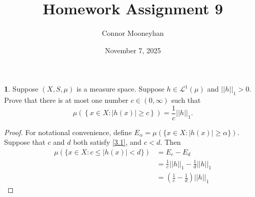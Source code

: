 \documentclass[12pt]{article}
\title{Homework Assignment 9}
\author{Connor Mooneyhan}
\date{November 7, 2025}
\theoremstyle{definition}
\newtheorem{ex}{}
\newenvironment{exercise}[1]{
	\renewcommand{\theex}{#1}
	\begin{ex}
		}{\end{ex}}
\begin{document}
\maketitle

\begin{exercise}{3}
	Suppose $(X, S, \mu)$ is a measure space.
	Suppose $h \in \mathcal{L}^1(\mu)$ and $||h||_1 > 0$.
	Prove that there is at most one number $c \in (0, \infty)$ such that \begin{equation*}
		\mu \left( \left\lbrace x \in X : |h(x)| \geq c \right\rbrace \right) = \frac{1}{c} ||h||_1. \label{3.1}
	\end{equation*}
\end{exercise}
\begin{proof}
	For notational convenience, define $E_\alpha = \mu(\lbrace x \in X : |h(x)| \geq \alpha \rbrace)$.
	Suppose that $c$ and $d$ both satisfy \eqref{3.1}, and $c < d$.
	Then \begin{align*}
		\mu(\lbrace x \in X : c \leq |h(x)| < d \rbrace) & = E_c - E_d                                     \\
		                                                 & = \frac{1}{c}||h||_1 - \frac{1}{d}||h||_1       \\
		                                                 & = \left(\frac{1}{c} - \frac{1}{d}\right)||h||_1
	\end{align*}
\end{proof}
\end{document}
